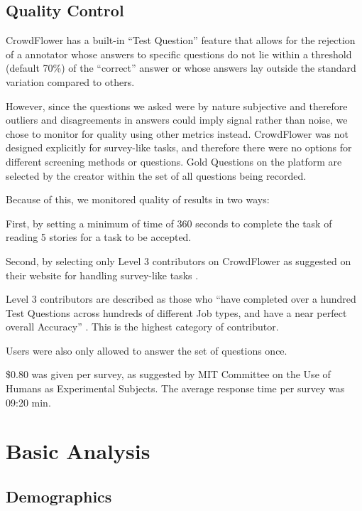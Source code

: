 



\subsection{Quality Control}

CrowdFlower has a built-in ``Test Question'' feature that allows for the rejection of a annotator whose answers to specific questions do not lie within a threshold (default 70\%) of the ``correct'' answer or whose answers lay outside the standard variation compared to others.

However, since the questions we asked were by nature subjective and therefore outliers and disagreements in answers could imply signal rather than noise, we chose to monitor for quality using other metrics instead. CrowdFlower was not designed explicitly for survey-like tasks, and therefore there were no options for different screening methods or questions. Gold Questions on the platform are selected by the creator within the set of all questions being recorded.

Because of this, we monitored quality of results in two ways:

First, by setting a minimum of time of 360 seconds to complete the task of reading 5 stories for a task to be accepted.

Second, by selecting only Level 3 contributors on CrowdFlower as suggested on their website for handling survey-like tasks \cite{CrowdFlower-guide}.

Level 3 contributors are described as those who ``have completed over a hundred Test Questions across hundreds of different Job types, and have a near perfect overall Accuracy'' \cite{CrowdFlower-levels}. This is the highest category of contributor.
 
Users were also only allowed to answer the set of questions once. 

\$0.80 was given per survey, as suggested by MIT Committee on the Use of Humans as Experimental Subjects. The average response time per survey was 09:20 min.


\section{Basic Analysis}


\subsection{Demographics}


